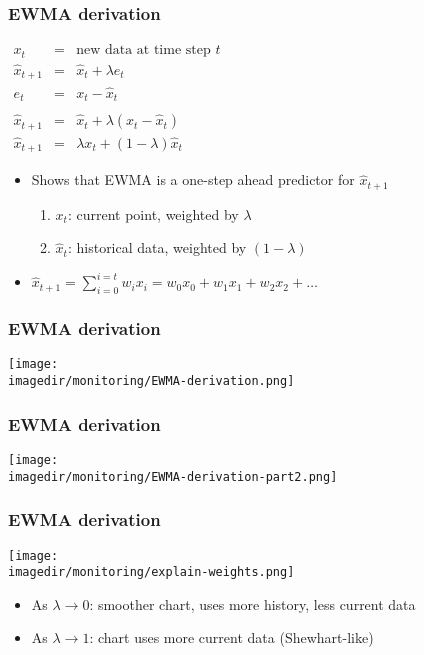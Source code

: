 \begin{frame}\frametitle{EWMA derivation}
	
	$ 
	\begin{array}{rcl}
		x_t &=& \text{new data at time step } t\\
		\hat{x}_{t+1} &=& \hat{x}_{t} + \lambda e_{t} \\
		e_t &=& x_t - \hat{x}_t \\
		\\
		\hat{x}_{t+1} &=& \hat{x}_{t} + \lambda \left(x_t - \hat{x}_t\right) \\
		\hat{x}_{t+1} &=& \lambda x_t + \left(1-\lambda \right)\hat{x}_{t} 
	\end{array}
	$
	\begin{itemize}
		\item	Shows that EWMA is a one-step ahead predictor for $\hat{x}_{t+1}$ 
		\begin{enumerate}
			\item	$x_t$: current point, weighted by $\lambda$ 
			\item	$\hat{x}_{t}$: historical data, weighted by $\left(1-\lambda \right)$ 
		\end{enumerate}
	\end{itemize}
	\begin{itemize}
		\item	$\hat{x}_{t+1} = \sum_{i=0}^{i=t}{w_i x_i} = w_0x_0 + w_1x_1 + w_2x_2 + \ldots $ 
	\end{itemize}
\end{frame}

\begin{frame}\frametitle{EWMA derivation}
	
	\texttt{[image: \\imagedir/monitoring/EWMA-derivation.png]}
\end{frame}

\begin{frame}\frametitle{EWMA derivation}
	
	\texttt{[image: \\imagedir/monitoring/EWMA-derivation-part2.png]}
\end{frame}

\begin{frame}\frametitle{EWMA derivation}
	
	\texttt{[image: \\imagedir/monitoring/explain-weights.png]}
	\begin{itemize}
		\item	As $\lambda \rightarrow 0$: smoother chart, uses more history, less current data 
		\item	As $\lambda \rightarrow 1$: chart uses more current data (Shewhart-like) 
	\end{itemize}
\end{frame}

